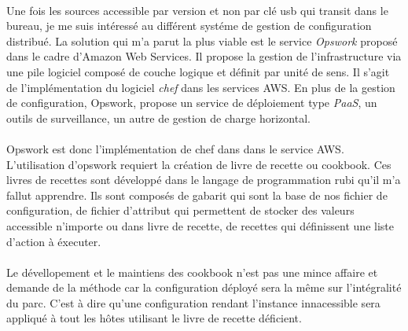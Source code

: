 \documentclass[11pt, a4paper ]{article}
\begin{document}
\begin{spacing}{1.5}
\paragraph{}
Une fois les sources accessible par version et non par clé usb qui transit dans le bureau, je me suis intéressé au différent systéme de gestion de configuration distribué. La solution qui m'a parut la plus viable est le service \emph{Opswork} proposé dans le cadre d'Amazon Web Services. Il propose la gestion de l'infrastructure via une pile logiciel composé de couche logique et définit par unité de sens. Il s'agit de l'implémentation du logiciel \emph{chef} dans les services AWS. En plus de la gestion de configuration, Opswork, propose un service de déploiement type \emph{PaaS}, un outils de surveillance, un autre de gestion de charge horizontal.
\paragraph{}
Opswork est donc l'implémentation de chef dans dans le service AWS. L'utilisation d'opswork requiert la création de livre de recette ou cookbook. Ces livres de recettes sont développé dans le langage de programmation rubi qu'il m'a fallut apprendre. Ils sont composés de gabarit qui sont la base de nos fichier de configuration, de fichier d'attribut qui permettent de stocker des valeurs accessible n'importe ou dans livre de recette, de recettes qui définissent une liste d'action à éxecuter.
\paragraph{}
Le dévellopement et le maintiens des cookbook n'est pas une mince affaire et demande de la méthode car la configuration déployé sera la même sur l'intégralité du parc. C'est à dire qu'une configuration rendant l'instance innacessible sera appliqué à tout les hôtes utilisant le livre de recette déficient. 

\end{spacing}
\end{document}
